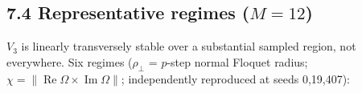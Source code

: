 \documentclass[
  11pt,
  a4paper,
]{article}
\begin{document}
\begin{landscape}

\subsection{\texorpdfstring{7.4 Representative regimes (\(M=12\))}{7.4 Representative regimes (M=12)}}\label{representative-regimes-m12}

\(V_3\) is linearly transversely stable over a substantial sampled region, not everywhere. Six regimes (\(\rho_\perp\) = \(p\)-step normal Floquet radius; \(\chi=\|\operatorname{Re}\Omega\times\operatorname{Im}\Omega\|\); independently reproduced at seeds 0,19,407):

\begingroup\fontsize{9.3}{12}\selectfont\setlength{\tabcolsep}{4pt}\renewcommand{\arraystretch}{1.18}


\end{landscape}
\end{document}
